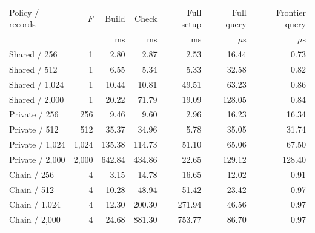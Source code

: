 \begin{tabular}{lrrrrrr}
\toprule
Policy / records & $F$ & Build & Check & Full setup & Full query & Frontier query\\
 & & ms & ms & ms & $\mu$s & $\mu$s\\
\midrule
Shared / 256 & 1 & 2.80 & 2.87 & 2.53 & 16.44 & 0.73\\
Shared / 512 & 1 & 6.55 & 5.34 & 5.33 & 32.58 & 0.82\\
Shared / 1,024 & 1 & 10.44 & 10.81 & 49.51 & 63.23 & 0.86\\
Shared / 2,000 & 1 & 20.22 & 71.79 & 19.09 & 128.05 & 0.84\\
Private / 256 & 256 & 9.46 & 9.60 & 2.96 & 16.23 & 16.34\\
Private / 512 & 512 & 35.37 & 34.96 & 5.78 & 35.05 & 31.74\\
Private / 1,024 & 1,024 & 135.38 & 114.73 & 51.10 & 65.06 & 67.50\\
Private / 2,000 & 2,000 & 642.84 & 434.86 & 22.65 & 129.12 & 128.40\\
Chain / 256 & 4 & 3.15 & 14.78 & 16.65 & 12.02 & 0.91\\
Chain / 512 & 4 & 10.28 & 48.94 & 51.42 & 23.42 & 0.97\\
Chain / 1,024 & 4 & 12.30 & 200.30 & 271.94 & 46.56 & 0.97\\
Chain / 2,000 & 4 & 24.68 & 881.30 & 753.77 & 86.70 & 0.97\\
\bottomrule
\end{tabular}
